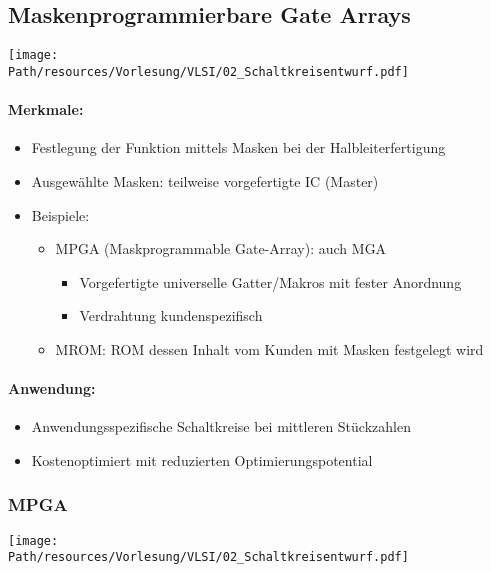 \newpage
\subsection{Maskenprogrammierbare Gate Arrays}
	\begin{center}
		\texttt{[image: \\Path/resources/Vorlesung/VLSI/02\_Schaltkreisentwurf.pdf]}
	\end{center}
	\paragraph{Merkmale:}
	\begin{itemize}
		\item Festlegung der Funktion mittels Masken bei der Halbleiterfertigung
		\item Ausgewählte Masken: teilweise vorgefertigte IC (Master)
		\item Beispiele:
			\begin{itemize}
				\item MPGA (Maskprogrammable Gate-Array): auch MGA
					\begin{itemize}
						\item Vorgefertigte universelle Gatter/Makros mit fester Anordnung
						\item Verdrahtung kundenspezifisch
					\end{itemize}
				\item MROM: ROM dessen Inhalt vom Kunden mit Masken festgelegt wird
			\end{itemize}
	\end{itemize}
	\paragraph{Anwendung:}
	\begin{itemize}
		\item Anwendungsspezifische Schaltkreise bei mittleren Stückzahlen
		\item Kostenoptimiert mit reduzierten Optimierungspotential
	\end{itemize}
	\subsubsection{MPGA}
		\begin{center}
			\texttt{[image: \\Path/resources/Vorlesung/VLSI/02\_Schaltkreisentwurf.pdf]}
		\end{center}
	
